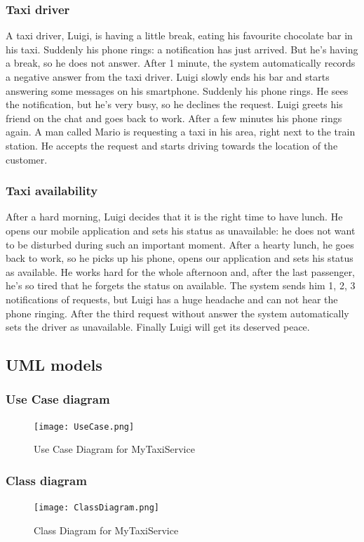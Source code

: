 		\subsubsection{Taxi driver}
			A taxi driver, Luigi, is having a little break, eating his favourite chocolate bar in his taxi. Suddenly
			his phone rings: a notification has just arrived. But he's having a break, so he does not answer.
			After 1 minute, the system automatically records a negative answer from the taxi driver.
			Luigi slowly ends his bar and starts answering some messages on his smartphone. Suddenly his phone
			rings. He sees the notification, but he's very busy, so he declines the request. Luigi greets his
			friend on the chat and goes back to work. After a few minutes his phone rings again. A man called
			Mario is requesting a taxi in his area, right next to the train station. He accepts the request and
			starts driving towards the location of the customer.
		\subsubsection{Taxi availability}
			After a hard morning, Luigi decides that it is the right time to have lunch. He opens our mobile
			application and sets his status as unavailable: he does not want to be disturbed during such an
			important moment. After a hearty lunch, he goes back to work, so he picks up his phone, opens our
			application and sets his status as available. He works hard for the whole afternoon and, after the
			last passenger, he's so tired that he forgets the status on available. The system sends him 1, 2, 3
			notifications of requests, but Luigi has a huge headache and can not hear the phone ringing. After
			the third request without answer the system automatically sets the driver as unavailable.
			Finally Luigi will get its deserved peace.
	\newpage
	\subsection{UML models}
		\subsubsection{Use Case diagram}
			\begin{figure}[h!]
				\centering
				\graphicspath{ {../SE2_IMAGES/} }
				\texttt{[image: UseCase.png]}
				\caption{Use Case Diagram for MyTaxiService}
			\end{figure}
		\newpage
		\subsubsection{Class diagram}
			\begin{figure}[h!]
				\centering
				\graphicspath{ {../SE2_IMAGES/} }
				\texttt{[image: ClassDiagram.png]}
				\caption{Class Diagram for MyTaxiService}
			\end{figure}
